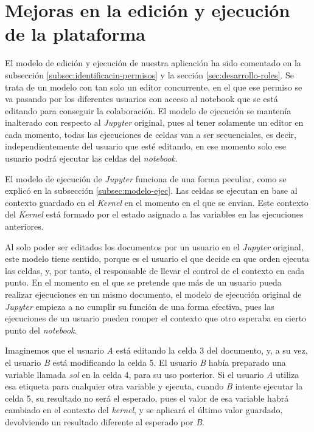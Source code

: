 \documentclass[11pt,spanish,listoffigures]{tfgetsinf}
\begin{document}

\section{Mejoras en la edición y ejecución de la plataforma}
\label{sec:mejoras-ejec}

El modelo de edición y ejecución de nuestra aplicación ha sido comentado en la subsección \ref{subsec:identificacin-permisos} y la sección \ref{sec:desarrollo-roles}. Se trata de un modelo con tan solo un editor concurrente, en el que ese permiso se va pasando por los diferentes usuarios con acceso al notebook que se está editando para conseguir la colaboración. El modelo de ejecución se mantenía inalterado con respecto al \textit{Jupyter} original, pues al tener solamente un editor en cada momento, todas las ejecuciones de celdas van a ser secuenciales, es decir, independientemente del usuario que esté editando, en ese momento solo ese usuario podrá ejecutar las celdas del \textit{notebook}.

El modelo de ejecución de \textit{Jupyter} funciona de una forma peculiar, como se explicó en la subsección \ref{subsec:modelo-ejec}. Las celdas se ejecutan en base al contexto guardado en el \textit{Kernel} en el momento en el que se envian. Este contexto del \textit{Kernel} está formado por el estado asignado a las variables en las ejecuciones anteriores. 

Al solo poder ser editados los documentos por un usuario en el \textit{Jupyter} original, este modelo tiene sentido, porque es el usuario el que decide en que orden ejecuta las celdas, y, por tanto, el  responsable de llevar el control de el contexto en cada punto. En el momento en el que se pretende que más de un usuario pueda realizar ejecuciones en un mismo documento, el modelo de ejecución original de \textit{Jupyter} empieza a no cumplir su función de una forma efectiva, pues las ejecuciones de un usuario pueden romper el contexto que otro esperaba en cierto punto del \textit{notebook}.

Imaginemos que el usuario \textit{A} está editando la celda 3 del documento, y, a su vez, el usuario \textit{B} está modificando la celda 5. El usuario \textit{B} había preparado una variable llamada \textit{sol} en la celda 4, para su uso posterior. Si el usuario \textit{A} utiliza esa etiqueta para cualquier otra variable y ejecuta, cuando \textit{B} intente ejecutar la celda 5, su resultado no será el esperado, pues el valor de esa variable habrá cambiado en el contexto del \textit{kernel}, y se aplicará el último valor guardado, devolviendo un resultado diferente al esperado por \textit{B}.
\end{document}
